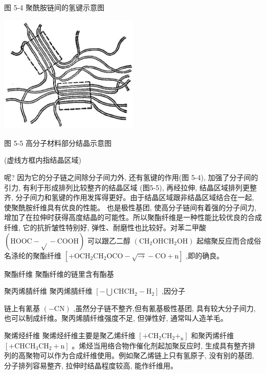 \documentclass[10pt]{article}
\begin{document}
图 5-4 聚酰胺链间的氢键示意图

\begin{center}
\includegraphics[max width=0.5\textwidth]{images/01912d16-be99-77bb-9535-4f3ed8d9946f_195_322338.jpg}
\end{center}

图 5-5 高分子材料部分结晶示意图

(虚线方框内指结晶区域)

呢? 因为它的分子链之间除分子间力外, 还有氢键的作用(图 5-4), 加强了分子间的引力, 有利于形成排列比较整齐的结晶区域 (图5-5), 再经拉伸, 结晶区域排列更整齐, 分子间力和氢键的作用发挥得更好。由于结晶区域跟非结晶区域结合在一起, 使聚酰胺纤维具有优良的性能。 也是极性基团, 使高分子链间有着强的分子间力, 增加了在拉伸时获得高度结晶的可能性。所以聚酯纤维是一种性能比较优良的合成纤维, 它的抗折皱性特别好, 弹性、耐磨性也比较好。对苯二甲酸 \(\left( {\mathrm{{HOOC}} - \sqrt{} - \mathrm{{COOH}}}\right)\) 可以跟乙二醇 \(\left( {{\mathrm{{CH}}}_{2}{\mathrm{{OHCH}}}_{2}\mathrm{{OH}}}\right)\) 起缩聚反应而合成俗名涤纶的聚酯纤维 \(\left\lbrack {+{\mathrm{{OCH}}}_{2}{\mathrm{{CH}}}_{2}\mathrm{{OCO}} - \sqrt{ \rightarrow } - \mathrm{{CO}} + \mathrm{n}}\right\rbrack\) ,即的确良。

聚酯纤维 聚酯纤维的链里含有酯基

聚丙烯腈纤维 聚丙烯腈纤维 \(\left\lbrack {-\bigcup {\mathrm{{CHCH}}}_{2} - {\mathrm{H}}_{2}}\right\rbrack\) ,因分子

链上有氰基 \(\left( {-\mathrm{{CN}}}\right)\) ,虽然分子链不整齐,但有氰基极性基团, 具有较大分子间力, 也可以制成纤维。聚丙烯腈纤维强度不足, 但弹性好, 通常叫人造羊毛。

聚烯烃纤维 聚烯烃纤维主要是聚乙烯纤维 \(\left\lbrack {+{\mathrm{{CH}}}_{2}{\mathrm{{CH}}}_{2}{ + }_{\mathrm{n}}}\right\rbrack\) 和聚丙烯纤维 \(\left\lbrack {+{\mathrm{{CHCH}}}_{3}{\mathrm{{CH}}}_{2} + \mathrm{n}}\right\rbrack\) 。烯烃当用络合物作催化剂起加聚反应时, 生成具有整齐排列的高聚物可以作为合成纤维使用。例如聚乙烯链上只有氢原子, 没有别的基团, 分子排列容易整齐, 拉伸时结晶程度较高, 能作纤维用。
\end{document}
